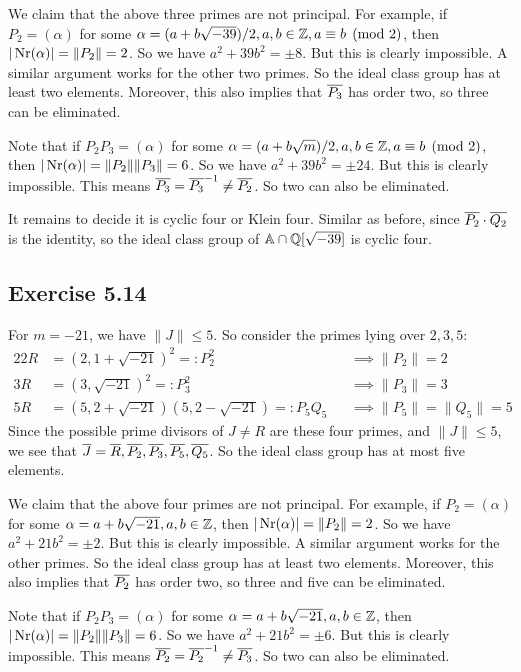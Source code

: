\documentclass[../Marcus.tex]{subfiles}
\begin{document}
We claim that the above three primes are not principal. For example, if $P_2 = (\alpha)$ for some $\alpha = (a+b\sqrt{-39})/2,a,b\in\mathbb{Z},a \equiv b \pmod{2}$, then $|\operatorname{Nr}(\alpha)| = \|P_2\| = 2$. So we have $a^2+39b^2 = \pm8$. But this is clearly impossible. A similar argument works for the other two primes. So the ideal class group has at least two elements. Moreover, this also implies that $\overline{P_3}$ has order two, so three can be eliminated.

Note that if $P_2P_3 = (\alpha)$ for some $\alpha = (a+b\sqrt{m})/2,a,b\in\mathbb{Z},a \equiv b \pmod{2}$, then $|\operatorname{Nr}(\alpha)| = \|P_2\|\|P_3\| = 6$. So we have $a^2+39b^2 = \pm24$. But this is clearly impossible. This means $\overline{P_3} = \overline{P_3}^{-1} \neq \overline{P_2}$. So two can also be eliminated.

It remains to decide it is cyclic four or Klein four. Similar as before, since $\overline{P_2} \cdot \overline{Q_2}$ is the identity, so the ideal class group of $\mathbb{A} \cap \mathbb{Q}[\sqrt{-39}]$ is cyclic four.

\subsection*{Exercise 5.14}

For $m=-21$, we have $\|J\| \leq 5$. So consider the primes lying over $2,3,5$:
\begin{alignat*}{2}
2R &= (2,1+\sqrt{-21})^2 =: P_2^2  &&\implies \|P_2\| = 2    \\
3R &= (3,\sqrt{-21})^2 =: P_3^2     &&\implies \|P_3\| = 3    \\
5R &= (5,2+\sqrt{-21})(5,2-\sqrt{-21}) =: P_5Q_5  &&\implies \|P_5\| = \|Q_5\| = 5
\end{alignat*}
Since the possible prime divisors of $J\neq R$ are these four primes, and $\|J\| \leq 5$, we see that $\overline{J}=\overline{R},\overline{P_2},\overline{P_3},\overline{P_5},\overline{Q_5}$. So the ideal class group has at most five elements.

We claim that the above four primes are not principal. For example, if $P_2 = (\alpha)$ for some $\alpha=a+b\sqrt{-21},a,b\in \mathbb{Z}$, then $|\operatorname{Nr}(\alpha)| = \|P_2\| = 2$. So we have $a^2+21b^2 = \pm2$. But this is clearly impossible. A similar argument works for the other primes. So the ideal class group has at least two elements. Moreover, this also implies that $\overline{P_2}$ has order two, so three and five can be eliminated.

Note that if $P_2P_3 = (\alpha)$ for some $\alpha=a+b\sqrt{-21},a,b\in \mathbb{Z}$, then $|\operatorname{Nr}(\alpha)| = \|P_2\|\|P_3\| = 6$. So we have $a^2+21b^2 = \pm6$. But this is clearly impossible. This means $\overline{P_2} = \overline{P_2}^{-1} \neq \overline{P_3}$. So two can also be eliminated.
\end{document}
